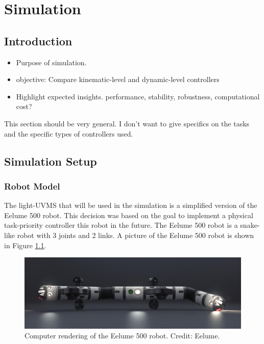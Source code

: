 \chapter{Simulation}

\section{Introduction}
\begin{itemize}
    \item Purpose of simulation.
    \item objective: Compare kinematic-level and dynamic-level controllers
    \item Highlight expected insights. performance, stability, robustness,
        computational cost?
\end{itemize}
This section should be very general. I don't want to give specifics on the
tasks and the specific types of controllers used.

\newpage
\section{Simulation Setup}

\subsection{Robot Model}


The light-UVMS that will be used in the simulation is a simplified version of
the Eelume 500 robot. This decision was based on the goal to implement a physical
task-priority controller this robot in the future. The Eelume 500 robot is a
snake-like robot with 3 joints and 2 links.
A picture of the Eelume 500 robot is shown in Figure \ref{fig:eely}.

\begin{figure}[h!]
    \centering
    \includegraphics[width=0.8\linewidth]{assets/images/eely.jpg}
    \caption{Computer rendering of the Eelume 500 robot. Credit: Eelume.}
    \label{fig:eely}
\end{figure}

